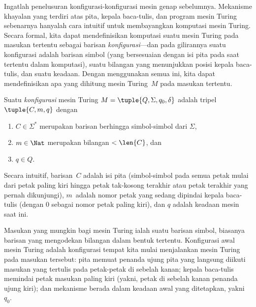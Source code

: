 \documentclass[../../../include/open-logic-section]{subfiles}
\begin{document}

\begin{explain}
Ingatlah penelusuran konfigurasi-konfigurasi mesin genap sebelumnya.
Mekanisme khayalan yang terdiri atas pita, kepala baca-tulis, dan program mesin
Turing sebenarnya hanyalah cara intuitif untuk membayangkan komputasi mesin
Turing. Secara formal, kita dapat mendefinisikan komputasi suatu mesin Turing
pada masukan tertentu sebagai barisan \emph{konfigurasi}---dan pada gilirannya
suatu konfigurasi adalah barisan simbol (yang bersesuaian dengan isi pita pada
saat tertentu dalam komputasi), suatu bilangan yang menunjukkan posisi kepala
baca-tulis, dan suatu keadaan. Dengan menggunakan semua ini, kita dapat
mendefinisikan apa yang dihitung mesin Turing~$M$ pada masukan tertentu.
\end{explain}

\begin{defn}[Konfigurasi]
Suatu \emph{konfigurasi} mesin Turing $M = \tuple{Q, \Sigma, q_0,
\delta}$ adalah tripel $\tuple{C, m, q}$ dengan
\begin{enumerate}
\item $C \in \Sigma^*$ merupakan barisan berhingga simbol-simbol dari $\Sigma$,
\item $m \in \Nat$ merupakan bilangan $< \len{C}$, dan
\item $q \in Q$.
\end{enumerate}
Secara intuitif, barisan~$C$ adalah isi pita (simbol-simbol pada semua petak
mulai dari petak paling kiri hingga petak tak-kosong terakhir atau petak
terakhir yang pernah dikunjungi), $m$~adalah nomor petak yang sedang dipindai
kepala baca-tulis (dengan $0$ sebagai nomor petak paling kiri), dan $q$ adalah
keadaan mesin saat ini.
\end{defn}

\begin{explain}
Masukan yang mungkin bagi mesin Turing ialah suatu barisan simbol, biasanya
barisan yang mengodekan bilangan dalam bentuk tertentu. Konfigurasi awal mesin
Turing adalah konfigurasi tempat kita mulai menjalankan mesin Turing pada
masukan tersebut: pita memuat penanda ujung pita yang langsung diikuti masukan
yang tertulis pada petak-petak di sebelah kanan; kepala baca-tulis memindai
petak masukan paling kiri (yakni, petak di sebelah kanan penanda ujung kiri);
dan mekanisme berada dalam keadaan awal yang ditetapkan, yakni~$q_0$.
\end{explain}
\end{document}
